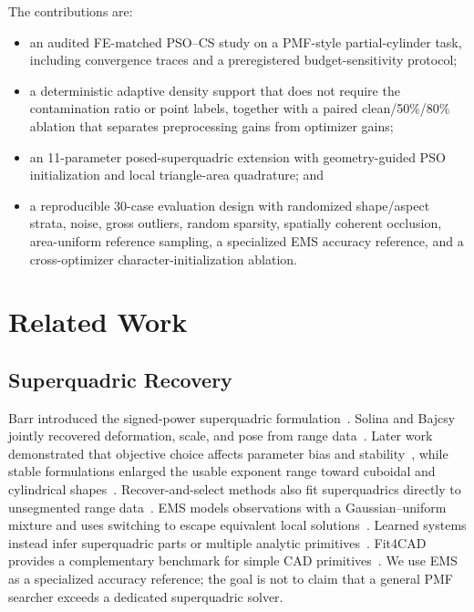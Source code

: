 \documentclass[conference]{IEEEtran}
\begin{document}
The contributions are:
\begin{itemize}
    \item an audited FE-matched PSO--CS study on a PMF-style partial-cylinder
    task, including convergence traces and a preregistered budget-sensitivity
    protocol;
    \item a deterministic adaptive density support that does not require the
    contamination ratio or point labels, together with a paired clean/50\%/80\%
    ablation that separates preprocessing gains from optimizer gains;
    \item an 11-parameter posed-superquadric extension with geometry-guided PSO
    initialization and local triangle-area quadrature; and
    \item a reproducible 30-case evaluation design with randomized shape/aspect strata,
    noise, gross outliers, random sparsity, spatially coherent occlusion,
    area-uniform reference sampling, a specialized EMS accuracy reference, and
    a cross-optimizer character-initialization ablation.
\end{itemize}

\section{Related Work}
\subsection{Superquadric Recovery}
Barr introduced the signed-power superquadric formulation~\cite{barr1981superquadrics}.
Solina and Bajcsy jointly recovered deformation, scale, and pose from range
data~\cite{solina1990recovery}.  Later work demonstrated that objective choice
affects parameter bias and stability~\cite{zhang2003objectives}, while stable
formulations enlarged the usable exponent range toward cuboidal and cylindrical
shapes~\cite{vaskevicius2019stable}.  Recover-and-select methods also fit
superquadrics directly to unsegmented range data~\cite{leonardis1997segmenting}.
EMS models observations with a
Gaussian--uniform mixture and uses switching to escape equivalent local
solutions~\cite{liu2022ems}.  Learned systems instead infer superquadric parts
or multiple analytic primitives~\cite{paschalidou2019superquadrics,li2019spfn,
sharma2020parsenet,yan2021hpnet}.  Fit4CAD provides a complementary benchmark
for simple CAD primitives~\cite{romanengo2022fit4cad}.
We use EMS as a specialized accuracy reference; the goal is not to claim that a
general PMF searcher exceeds a dedicated superquadric solver.
\end{document}

